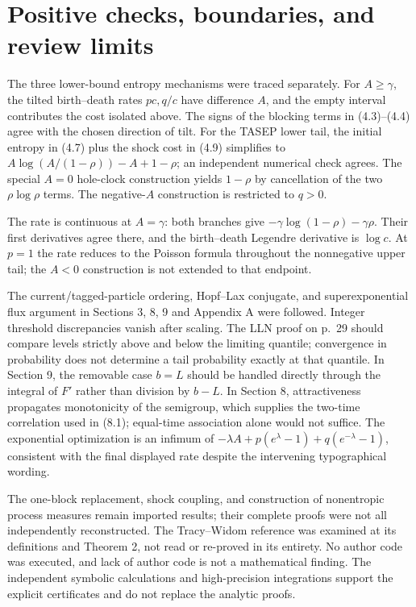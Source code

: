 \documentclass[10pt]{article}
\begin{document}
\section*{Positive checks, boundaries, and review limits}
The three lower-bound entropy mechanisms were traced separately. For \(A\geq\gamma\), the tilted birth–death rates \(pc,q/c\) have difference \(A\), and the empty interval contributes the cost isolated above. The signs of the blocking terms in (4.3)–(4.4) agree with the chosen direction of tilt. For the TASEP lower tail, the initial entropy in (4.7) plus the shock cost in (4.9) simplifies to \(A\log(A/(1-\rho))-A+1-\rho\); an independent numerical check agrees. The special \(A=0\) hole-clock construction yields \(1-\rho\) by cancellation of the two \(\rho\log\rho\) terms. The negative-\(A\) construction is restricted to \(q>0\).\par
The rate is continuous at \(A=\gamma\): both branches give \(-\gamma\log(1-\rho)-\gamma\rho\). Their first derivatives agree there, and the birth–death Legendre derivative is \(\log c\). At \(p=1\) the rate reduces to the Poisson formula throughout the nonnegative upper tail; the \(A<0\) construction is not extended to that endpoint.\par
The current/tagged-particle ordering, Hopf–Lax conjugate, and superexponential flux argument in Sections 3, 8, 9 and Appendix A were followed. Integer threshold discrepancies vanish after scaling. The LLN proof on p. 29 should compare levels strictly above and below the limiting quantile; convergence in probability does not determine a tail probability exactly at that quantile. In Section 9, the removable case \(b=L\) should be handled directly through the integral of \(F'\) rather than division by \(b-L\). In Section 8, attractiveness propagates monotonicity of the semigroup, which supplies the two-time correlation used in (8.1); equal-time association alone would not suffice. The exponential optimization is an infimum of \(-\lambda A+p(e^\lambda-1)+q(e^{-\lambda}-1)\), consistent with the final displayed rate despite the intervening typographical wording.\par
The one-block replacement, shock coupling, and construction of nonentropic process measures remain imported results; their complete proofs were not all independently reconstructed. The Tracy–Widom reference was examined at its definitions and Theorem 2, not read or re-proved in its entirety. No author code was executed, and lack of author code is not a mathematical finding. The independent symbolic calculations and high-precision integrations support the explicit certificates and do not replace the analytic proofs.\par
\end{document}
